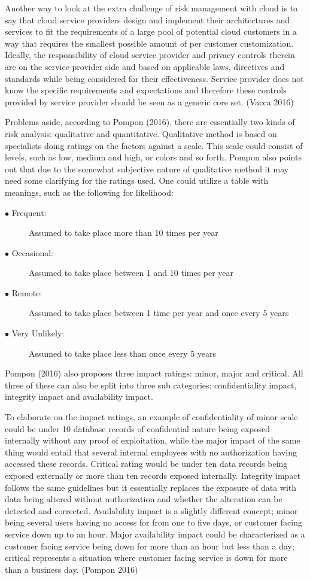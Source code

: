 \documentclass{article}
\begin{document}
Another way to look at the extra challenge of risk management with cloud is to say that cloud service providers design and implement their architectures and services to fit the requirements of a large pool of potential cloud customers in a way that requires the smallest possible amount of per customer customization. Ideally, the responsibility of cloud service provider and privacy controls therein are on the service provider side and based on applicable laws, directives and standards while being considered for their effectiveness. Service provider does not know the specific requirements and expectations and therefore these controls provided by service provider should be seen as a generic core set. (Vacca 2016)
\par
Problems aside, according to Pompon (2016), there are essentially two kinds of risk analysis: qualitative and quantitative. Qualitative method is based on specialists doing ratings on the factors against a scale. This scale could consist of levels, such as low, medium and high, or colors and so forth.
Pompon also points out that due to the somewhat subjective nature of qualitative method it may need some clarifying for the ratings used. One could utilize a table with meanings, such as the following for likelihood:
\begin{description}
	\item[$\bullet$ Frequent:] Assumed to take place more than 10 times per year
	\item[$\bullet$ Occasional:] Assumed to take place between 1 and 10 times per year
	\item[$\bullet$ Remote:] Assumed to take place between 1 time per year and once every 5 years
	\item[$\bullet$ Very Unlikely:] Assumed to take place less than once every 5 years
\end{description}
Pompon (2016) also proposes three impact ratings: minor, major and critical. All three of these can also be split into three sub categories: confidentiality impact, integrity impact and availability impact.
\par
To elaborate on the impact ratings, an example of confidentiality of minor scale could be under 10 database records of confidential nature being exposed internally without any proof of exploitation, while the major impact of the same thing would entail that several internal employees with no authorization having accessed these records. Critical rating would be under ten data records being exposed externally or more than ten records exposed internally. Integrity impact follows the same guidelines but it essentially replaces the exposure of data with data being altered without authorization and whether the alteration can be detected and corrected. Availability impact is a slightly different concept; minor being several users having no access for from one to five days, or customer facing service down up to an hour. Major availability impact could be characterized as a customer facing service being down for more than an hour but less than a day; critical represents a situation where customer facing service is down for more than a business day. (Pompon 2016) 
\end{document}
